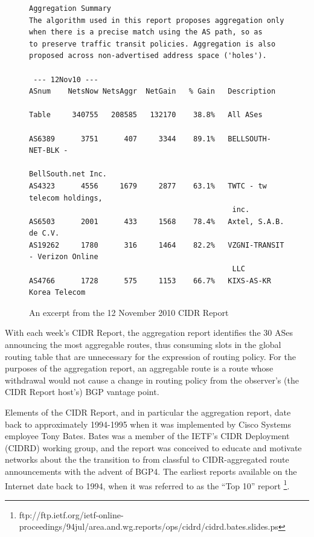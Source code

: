 \begin{figure}
\begin{lstlisting}[frame=trlb]
Aggregation Summary
The algorithm used in this report proposes aggregation only
when there is a precise match using the AS path, so as
to preserve traffic transit policies. Aggregation is also
proposed across non-advertised address space ('holes').

 --- 12Nov10 ---
ASnum    NetsNow NetsAggr  NetGain   % Gain   Description

Table     340755   208585   132170    38.8%   All ASes

AS6389      3751      407     3344    89.1%   BELLSOUTH-NET-BLK -
                                               BellSouth.net Inc.
AS4323      4556     1679     2877    63.1%   TWTC - tw telecom holdings,
                                               inc.
AS6503      2001      433     1568    78.4%   Axtel, S.A.B. de C.V.
AS19262     1780      316     1464    82.2%   VZGNI-TRANSIT - Verizon Online
                                               LLC
AS4766      1728      575     1153    66.7%   KIXS-AS-KR Korea Telecom
\end{lstlisting}
\caption{An excerpt from the 12 November 2010 CIDR Report}
\label{fig:ex_cidr_report}
\end{figure}

With each week's CIDR Report, the aggregation report identifies the 30 ASes
announcing the most aggregable routes, thus consuming slots in the global
routing table that are unnecessary for the expression of routing policy. For
the purposes of the aggregation report, an aggregable route is a route whose
withdrawal would not cause a change in routing policy from the observer's (the
CIDR Report host's) BGP vantage point.

Elements of the CIDR Report, and in particular the aggregation report, date
back to approximately 1994-1995 when it was implemented by Cisco Systems
employee Tony Bates. Bates was a member of the IETF's CIDR Deployment (CIDRD)
working group, and the report was conceived to educate and motivate networks
about the the transition to from classful to CIDR-aggregated route
announcements with the advent of BGP4. The earliest reports available on the
Internet date back to 1994, when it was referred to as the ``Top 10'' report
\footnote{ftp://ftp.ietf.org/ietf-online-proceedings/94jul/area.and.wg.reports/ops/cidrd/cidrd.bates.slides.ps}.

